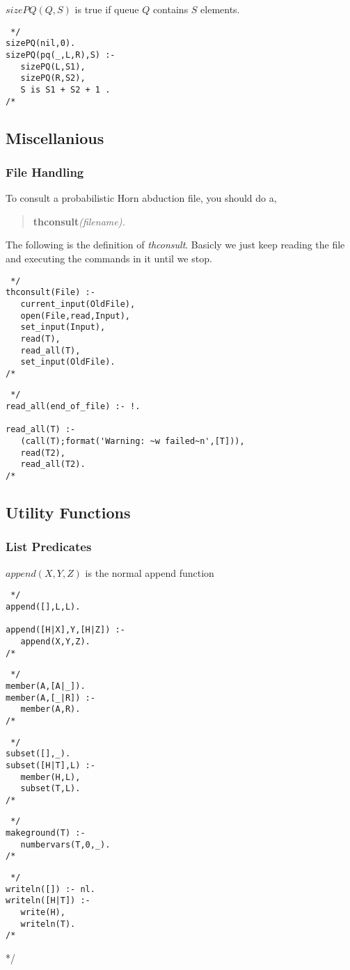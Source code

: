 $sizePQ(Q,S)$ is true if queue $Q$ contains $S$ elements.
\begin{verbatim} */
sizePQ(nil,0).
sizePQ(pq(_,L,R),S) :-
   sizePQ(L,S1),
   sizePQ(R,S2),
   S is S1 + S2 + 1 .
/* \end{verbatim}

\subsection{Miscellanious}
\subsubsection{File Handling}
To consult a probabilistic Horn abduction file, you should do a,
\begin{verse}
{\bf thconsult}\em (filename).
\end{verse}
The following is the definition of {\em thconsult}. Basicly we just
keep reading the file and executing the commands in it until we stop.
\begin{verbatim} */
thconsult(File) :-
   current_input(OldFile),
   open(File,read,Input),
   set_input(Input),
   read(T),
   read_all(T),
   set_input(OldFile).
/* \end{verbatim}
\begin{verbatim} */
read_all(end_of_file) :- !.

read_all(T) :-
   (call(T);format('Warning: ~w failed~n',[T])),
   read(T2),
   read_all(T2).
/* \end{verbatim}

\subsection{Utility Functions}
\subsubsection{List Predicates}
$append(X,Y,Z)$ is the normal append function
\begin{verbatim} */
append([],L,L).

append([H|X],Y,[H|Z]) :-
   append(X,Y,Z).
/* \end{verbatim}

\begin{verbatim} */
member(A,[A|_]).
member(A,[_|R]) :-
   member(A,R).
/* \end{verbatim}
\begin{verbatim} */
subset([],_).
subset([H|T],L) :-
   member(H,L),
   subset(T,L).
/* \end{verbatim}
\begin{verbatim} */
makeground(T) :-
   numbervars(T,0,_).
/* \end{verbatim}

\begin{verbatim} */
writeln([]) :- nl.
writeln([H|T]) :-
   write(H),
   writeln(T).
/* \end{verbatim}
\printindex

*/
